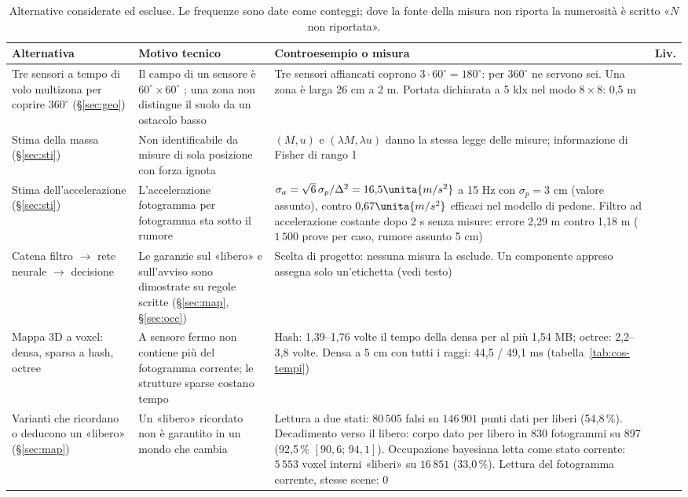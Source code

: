 \begin{table}[H]\centering\footnotesize
\caption{Alternative considerate ed escluse. Le frequenze sono date come conteggi; dove la fonte della misura non riporta la numerosità è scritto «$N$ non riportata».}\label{tab:cos-alternative}
\begin{tabularx}{\textwidth}{@{}>{\RaggedRight\arraybackslash}p{3.3cm}>{\RaggedRight\arraybackslash}p{4.4cm}Lc@{}}\toprule
Alternativa & Motivo tecnico & Controesempio o misura & Liv.\\\midrule
Tre sensori a tempo di volo multizona per coprire $360^\circ$ (\S\ref{sec:geo}) & Il campo di un sensore è $60^\circ\times60^\circ$ \cite{st-vl53l7cx}; una zona non distingue il suolo da un ostacolo basso & Tre sensori affiancati coprono $3\cdot60^\circ=180^\circ$: per $360^\circ$ ne servono sei. Una zona è larga 26 cm a 2 m. Portata dichiarata a 5 klx nel modo $8\times8$: 0,5 m \cite{st-vl53l7cx} & \\
Stima della massa (\S\ref{sec:sti}) & Non identificabile da misure di sola posizione con forza ignota & $(M,u)$ e $(\lambda M,\lambda u)$ danno la stessa legge delle misure; informazione di Fisher di rango 1 & \\
Stima dell'accelerazione (\S\ref{sec:sti}) & L'accelerazione fotogramma per fotogramma sta sotto il rumore & $\sigma_a=\sqrt6\,\sigma_p/\Delta^2=16{,}5\unita{m/s^2}$ a 15 Hz con $\sigma_p=3$ cm (valore assunto), contro $0{,}67\unita{m/s^2}$ efficaci nel modello di pedone. Filtro ad accelerazione costante dopo 2 s senza misure: errore 2,29 m contro 1,18 m ($1\,500$ prove per caso, rumore assunto 5 cm) &  \\
Catena filtro $\to$ rete neurale $\to$ decisione & Le garanzie sul «libero» e sull'avviso sono dimostrate su regole scritte (\S\ref{sec:map}, \S\ref{sec:occ}) & Scelta di progetto: nessuna misura la esclude. Un componente appreso assegna solo un'etichetta (vedi testo) & \\
Mappa 3D a voxel: densa, sparsa a hash, octree & A sensore fermo non contiene più del fotogramma corrente; le strutture sparse costano tempo & Hash: 1,39--1,76 volte il tempo della densa per al più 1,54 MB; octree: 2,2--3,8 volte. Densa a 5 cm con tutti i raggi: 44,5 / 49,1 ms (tabella~\ref{tab:cos-tempi}) & \\
Varianti che ricordano o deducono un «libero» (\S\ref{sec:map}) & Un «libero» ricordato non è garantito in un mondo che cambia & Lettura a due stati: $80\,505$ falsi su $146\,901$ punti dati per liberi (54,8\,\%). Decadimento verso il libero: corpo dato per libero in 830 fotogrammi su 897 (92,5\,\% $[90{,}6;\,94{,}1]$). Occupazione bayesiana letta come stato corrente: $5\,553$ voxel interni «liberi» su $16\,851$ (33,0\,\%). Lettura del fotogramma corrente, stesse scene: 0 & \\

\end{tabularx}
\end{table}
